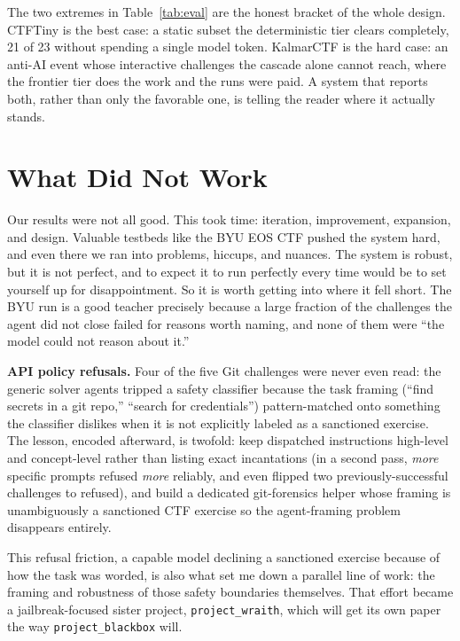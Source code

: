 \documentclass[10pt,twocolumn]{article}
\begin{document}
The two extremes in Table~\ref{tab:eval} are the honest bracket of the whole design. CTFTiny is the best
case: a static subset the deterministic tier clears completely, 21 of 23 without spending a single model
token. KalmarCTF is the hard case: an anti-AI event whose interactive challenges the cascade alone cannot
reach, where the frontier tier does the work and the runs were paid. A system that reports both, rather than
only the favorable one, is telling the reader where it actually stands.

\section{What Did Not Work}
\label{sec:didnt}

Our results were not all good. This took time: iteration, improvement, expansion, and design. Valuable
testbeds like the BYU EOS CTF pushed the system hard, and even there we ran into problems, hiccups, and
nuances. The system is robust, but it is not perfect, and to expect it to run perfectly every time would be to
set yourself up for disappointment. So it is worth getting into where it fell short. The BYU run is a good
teacher precisely because a large fraction of the challenges the agent did not close failed for reasons worth
naming, and none of them were ``the model could not reason about it.''

\medskip
\textbf{API policy refusals.} Four of the five Git challenges were never even read: the generic solver agents
tripped a safety classifier because the task framing (``find secrets in a git repo,'' ``search for
credentials'') pattern-matched onto something the classifier dislikes when it is not explicitly labeled as a
sanctioned exercise. The lesson, encoded afterward, is twofold: keep dispatched instructions high-level and
concept-level rather than listing exact incantations (in a second pass, \emph{more} specific prompts refused
\emph{more} reliably, and even flipped two previously-successful challenges to refused), and build a dedicated
git-forensics helper whose framing is unambiguously a sanctioned CTF exercise so the agent-framing problem
disappears entirely.

This refusal friction, a capable model declining a sanctioned exercise because of how the task was worded, is
also what set me down a parallel line of work: the framing and robustness of those safety boundaries
themselves. That effort became a jailbreak-focused sister project, \texttt{project\_wraith}, which will get its
own paper the way \texttt{project\_blackbox} will.
\end{document}
